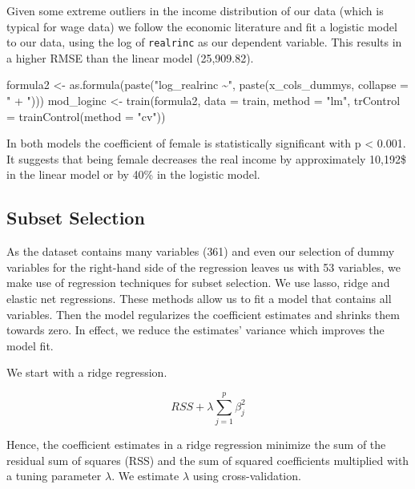 \documentclass[11pt,a4paper]{article}
\newenvironment{Shaded}{\begin{snugshade}}{\end{snugshade}}
\newcommand{\AttributeTok}[1]{\textcolor[rgb]{0.77,0.63,0.00}{#1}}
\newcommand{\FunctionTok}[1]{\textcolor[rgb]{0.00,0.00,0.00}{#1}}
\newcommand{\NormalTok}[1]{#1}
\newcommand{\OtherTok}[1]{\textcolor[rgb]{0.56,0.35,0.01}{#1}}
\newcommand{\StringTok}[1]{\textcolor[rgb]{0.31,0.60,0.02}{#1}}
\begin{document}
Given some extreme outliers in the income distribution of our data
(which is typical for wage data) we follow the economic literature
\autocite{Ermini} and fit a logistic model to our data, using the log of
\texttt{realrinc} as our dependent variable. This results in a higher
RMSE than the linear model (25,909.82).

\begin{Shaded}
\begin{Highlighting}[]
\NormalTok{formula2 }\OtherTok{\textless{}{-}} \FunctionTok{as.formula}\NormalTok{(}\FunctionTok{paste}\NormalTok{(}\StringTok{"log\_realrinc \textasciitilde{}"}\NormalTok{, }\FunctionTok{paste}\NormalTok{(x\_cols\_dummys, }\AttributeTok{collapse =} \StringTok{" + "}\NormalTok{)))}
\NormalTok{mod\_loginc }\OtherTok{\textless{}{-}} \FunctionTok{train}\NormalTok{(formula2,}
                    \AttributeTok{data =}\NormalTok{ train, }
                    \AttributeTok{method =} \StringTok{"lm"}\NormalTok{,  }
                    \AttributeTok{trControl =} \FunctionTok{trainControl}\NormalTok{(}\AttributeTok{method =} \StringTok{"cv"}\NormalTok{))}
\end{Highlighting}
\end{Shaded}

In both models the coefficient of female is statistically significant
with p \textless{} 0.001. It suggests that being female decreases the
real income by approximately 10,192\$ in the linear model or by 40\% in
the logistic model.

\hypertarget{subset-selection}{%
\subsection{Subset Selection}\label{subset-selection}}

As the dataset contains many variables (361) and even our selection of
dummy variables for the right-hand side of the regression leaves us with
53 variables, we make use of regression techniques for subset selection.
We use lasso, ridge and elastic net regressions. These methods allow us
to fit a model that contains all variables. Then the model regularizes
the coefficient estimates and shrinks them towards zero. In effect, we
reduce the estimates' variance which improves the model fit.

We start with a ridge regression.

\[
RSS + \lambda \sum^p _{j=1} \beta^2_j 
\]

Hence, the coefficient estimates in a ridge regression minimize the sum
of the residual sum of squares (RSS) and the sum of squared coefficients
multiplied with a tuning parameter \(\lambda\). We estimate \(\lambda\)
using cross-validation.
\end{document}
